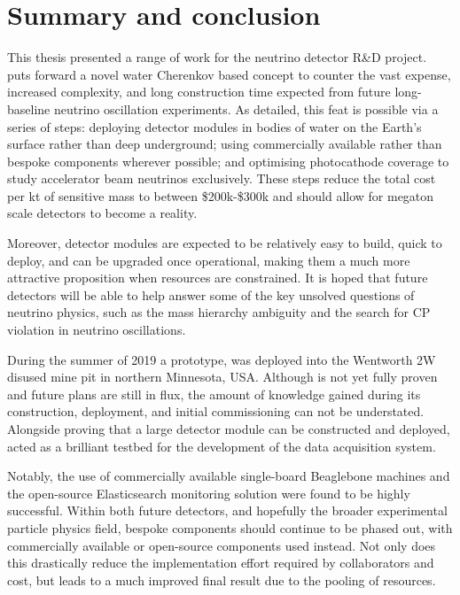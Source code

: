 \chapter{Summary and conclusion} %
\label{chap:conclusion} %

This thesis presented a range of work for the \chips neutrino detector R\&D project. \chips puts
forward a novel water Cherenkov based concept to counter the vast expense, increased complexity,
and long construction time expected from future long-baseline neutrino oscillation experiments. As
detailed, this feat is possible via a series of steps: deploying detector modules in bodies of
water on the Earth's surface rather than deep underground; using commercially available rather
than bespoke components wherever possible; and optimising photocathode coverage to study
accelerator beam neutrinos exclusively. These steps reduce the total cost per kt of sensitive mass
to between \$200k-\$300k and should allow for megaton scale detectors to become a reality.

Moreover, \chips detector modules are expected to be relatively easy to build, quick to deploy,
and can be upgraded once operational, making them a much more attractive proposition when
resources are constrained. It is hoped that future \chips detectors will be able to help answer
some of the key unsolved questions of neutrino physics, such as the mass hierarchy ambiguity and
the search for CP violation in neutrino oscillations.

During the summer of 2019 a \chips prototype, \chipsfive was deployed into the Wentworth 2W
disused mine pit in northern Minnesota, USA. Although \chipsfive is not yet fully proven and
future plans are still in flux, the amount of knowledge gained during its construction,
deployment, and initial commissioning can not be understated. Alongside proving that a large
\chips detector module can be constructed and deployed, \chipsfive acted as a brilliant testbed
for the development of the \chips data acquisition system. 

Notably, the use of commercially available single-board Beaglebone machines and the open-source
Elasticsearch monitoring solution were found to be highly successful. Within both future \chips
detectors, and hopefully the broader experimental particle physics field, bespoke components
should continue to be phased out, with commercially available or open-source components used
instead. Not only does this drastically reduce the implementation effort required by collaborators
and cost, but leads to a much improved final result due to the pooling of resources. 

